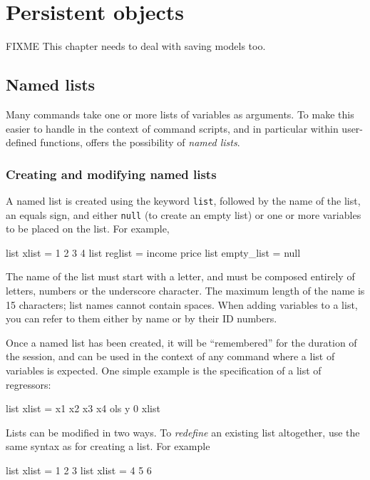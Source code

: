 \chapter{Persistent objects}
\label{persist}


FIXME This chapter needs to deal with saving models too.

\section{Named lists}
\label{named-lists}

Many  commands take one or more lists of variables as
arguments.  To make this easier to handle in the context of command
scripts, and in particular within user-defined functions, 
offers the possibility of \textit{named lists}.  

\subsection{Creating and modifying named lists}

A named list is created using the keyword \texttt{list}, followed by
the name of the list, an equals sign, and either \texttt{null} (to
create an empty list) or one or more variables to be placed on the
list.  For example,
%
\begin{code}
list xlist = 1 2 3 4
list reglist = income price 
list empty_list = null
\end{code}

The name of the list must start with a letter, and must be composed
entirely of letters, numbers or the underscore character.  The maximum
length of the name is 15 characters; list names cannot contain
spaces.  When adding variables to a list, you can refer to them either
by name or by their ID numbers. 

Once a named list has been created, it will be ``remembered'' for the
duration of the  session, and can be used in the context of
any  command where a list of variables is expected.  One
simple example is the specification of a list of regressors:
%
\begin{code}
list xlist = x1 x2 x3 x4
ols y 0 xlist
\end{code}

Lists can be modified in two ways.  To \textit{redefine} an existing
list altogether, use the same syntax as for creating a list.  For
example
%
\begin{code}
list xlist = 1 2 3
list xlist = 4 5 6
\end{code}

